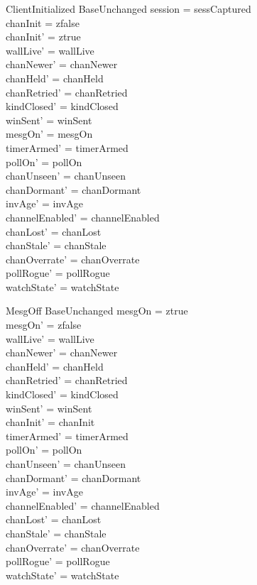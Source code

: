 \documentclass[a4paper,10pt,fleqn]{article}
\begin{document}
\begin{schema}{ClientInitialized}
  BaseUnchanged
  \where
  session = sessCaptured \\
  chanInit = zfalse \\
  chanInit' = ztrue \\
  wallLive' = wallLive \\
  chanNewer' = chanNewer \\
  chanHeld' = chanHeld \\
  chanRetried' = chanRetried \\
  kindClosed' = kindClosed \\
  winSent' = winSent \\
  mesgOn' = mesgOn \\
  timerArmed' = timerArmed \\
  pollOn' = pollOn \\
  chanUnseen' = chanUnseen \\
  chanDormant' = chanDormant \\
  invAge' = invAge \\
  channelEnabled' = channelEnabled \\
  chanLost' = chanLost \\
  chanStale' = chanStale \\
  chanOverrate' = chanOverrate \\
  pollRogue' = pollRogue \\
  watchState' = watchState
\end{schema}

\begin{schema}{MesgOff}
  BaseUnchanged
  \where
  mesgOn = ztrue \\
  mesgOn' = zfalse \\
  wallLive' = wallLive \\
  chanNewer' = chanNewer \\
  chanHeld' = chanHeld \\
  chanRetried' = chanRetried \\
  kindClosed' = kindClosed \\
  winSent' = winSent \\
  chanInit' = chanInit \\
  timerArmed' = timerArmed \\
  pollOn' = pollOn \\
  chanUnseen' = chanUnseen \\
  chanDormant' = chanDormant \\
  invAge' = invAge \\
  channelEnabled' = channelEnabled \\
  chanLost' = chanLost \\
  chanStale' = chanStale \\
  chanOverrate' = chanOverrate \\
  pollRogue' = pollRogue \\
  watchState' = watchState
\end{schema}
\end{document}
